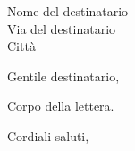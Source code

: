 \documentclass{letter}
\begin{document}
\begin{letter}{Nome del destinatario \\ Via del destinatario \\ Città}
\opening{Gentile destinatario,}

Corpo della lettera.

\closing{Cordiali saluti,}

\end{letter}
\end{document}
